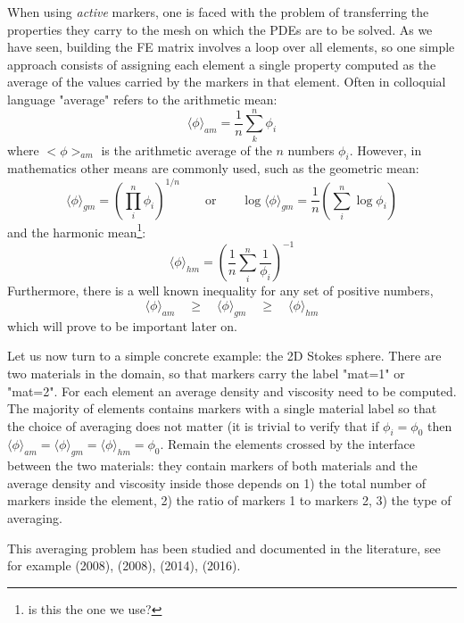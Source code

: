 When using {\it active} markers, one is faced with the problem of transferring the properties they carry to the mesh on which the PDEs are to be solved. 
As we have seen, building the FE matrix involves a loop over all elements, so one simple approach consists of assigning each element a single property
computed as the average of the values carried by the markers in that element. 
Often in colloquial language "average" refers to the arithmetic mean: 
\begin{equation}
\langle \phi \rangle_{am}=\frac{1}{n} \sum_k^n \phi_i 
\end{equation}
where $<\phi>_{am}$ is the arithmetic average of the $n$ numbers $\phi_i$. 
However, in mathematics other means are commonly used, such as the geometric mean: 
\begin{equation}
\langle \phi \rangle_{gm}=\left( \prod_i^n \phi_i \right)^{1/n}
\qquad
\text{or}
\qquad
\log \langle \phi \rangle_{gm}= \frac{1}{n} \left( \sum_i^n \log \phi_i \right)
\end{equation}
and the harmonic mean\footnote{is this the one we use?}: 
\begin{equation}
\langle \phi \rangle_{hm}=\left( \frac{1}{n}\sum_i^n \frac{1}{\phi_i} \right)^{-1}
\end{equation}
Furthermore, there is a well known inequality for any set of positive numbers,
\begin{equation}
\langle \phi \rangle_{am}\quad  \geq \quad
\langle \phi \rangle_{gm}\quad  \geq \quad
\langle \phi \rangle_{hm} 
\end{equation}
which will prove to be important later on. 

Let us now turn to a simple concrete example: the 2D Stokes sphere. 
There are two materials in the domain, so that markers carry the label "mat=1" or "mat=2".
For each element an average density and viscosity need to be computed. The majority of elements contains markers
with a single material label so that the choice of averaging does not matter (it is trivial to verify that 
if $\phi_i=\phi_0$ then $\langle \phi \rangle_{am}=\langle \phi \rangle_{gm}=\langle \phi \rangle_{hm}=\phi_0$.
Remain the elements crossed by the interface between the two materials: they contain markers of both materials
and the average density and viscosity inside those depends on 1) the total number of markers inside the element, 
2) the ratio of markers 1 to markers 2, 3) the type of averaging. 

This averaging problem has been studied and documented in the literature, see
for example 
\textcite{scbe08} (2008), \textcite{deka08} (2008), \textcite{thmk14} (2014), 
\textcite{pukp16} (2016).

